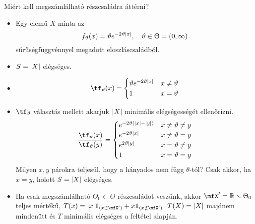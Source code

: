 \documentclass[aspectratio=169,notheorems,9pt,\option]{beamer}
\begin{document}
\begin{frame}{Miért kell megszámlálható részcsaládra áttérni?}
  \begin{itemize}
    \item Egy elemű $X$ minta  az 
    \begin{displaymath}
      f_\theta(x) = \theta e^{-2\theta \abs*{x}} ,\quad\theta\in\Theta=(0,\infty)
    \end{displaymath}
    sűrűségfüggvénnyel megadott eloszláscsaládból.
    \item $S=\abs*{X}$ elégséges.
    \item 
    \begin{displaymath}
      \tf_\theta(x)=\begin{cases}
        \theta e^{-2\theta \abs*{x}}& x\neq \theta\\
        1& x=\theta
      \end{cases}  
    \end{displaymath}
    \item $\tf_\theta$ választás mellett akarjuk $\abs*{X}$ minimális elégségességét ellenőrizni.
    \begin{displaymath}
      \frac{\tf_\theta(x)}{\tf_\theta(y)}=\begin{cases}
        e^{-2\theta(\abs*{x}-\abs*{y})} & x\neq\theta\neq y\\
        e^{-2\theta\abs*{x}} & x\neq\theta=y\\
        e^{2\theta\abs*{y}} &x=\theta\neq y\\
        1 & x=\theta=y
      \end{cases}
    \end{displaymath}
    Milyen $x,y$ párokra teljesül, hogy a hányados nem függ $\theta$-tól?
    Csak akkor, ha $x=y$, holott $S=\abs*{X}$ elégséges.
    \item Ha csak megszámlálható $\Theta_0\subset \Theta$ részcsaládot veszünk, akkor 
    $\mfX'=\real\setminus\Theta_0$ teljes mértékű,  
    $T(x)=\abs{x}\I{x\in \mfX'}+x\I{x\notin\mfX'}$.
    $T(X)=\abs{X}$ majdnem mindenütt és $T$ minimális elégséges a feltétel alapján.
  \end{itemize}
\end{frame}
\end{document}

